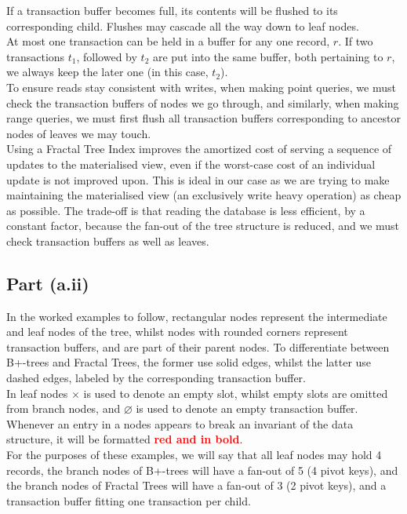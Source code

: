 If a transaction buffer becomes full, its contents will be flushed to its corresponding child. Flushes may cascade all the way down to leaf nodes.\\[1em]

At most one transaction can be held in a buffer for any one record, $r$. If two transactions $t_1$, followed by $t_2$ are put into the same buffer, both pertaining to $r$, we always keep the later one (in this case, $t_2$).\\[1em]

To ensure reads stay consistent with writes, when making point queries, we must check the transaction buffers of nodes we go through, and similarly, when making range queries, we must first flush all transaction buffers corresponding to ancestor nodes of leaves we may touch.\\[1em]

Using a Fractal Tree Index improves the amortized cost of serving a sequence of updates to the materialised view, even if the worst-case cost of an individual update is not improved upon. This is ideal in our case as we are trying to make maintaining the materialised view (an exclusively write heavy operation) as cheap as possible. The trade-off is that reading the database is less efficient, by a constant factor, because the fan-out of the tree structure is reduced, and we must check transaction buffers as well as leaves.

\subsection{Part (a.ii)}\label{sec:q-1-a-ii}

In the worked examples to follow, rectangular nodes represent the intermediate and leaf nodes of the tree, whilst nodes with rounded corners represent transaction buffers, and are part of their parent nodes. To differentiate between B+-trees and Fractal Trees, the former use solid edges, whilst the latter use dashed edges, labeled by the corresponding transaction buffer.\\[1em]

In leaf nodes $\times$ is used to denote an empty slot, whilst empty slots are omitted from branch nodes, and $\varnothing$ is used to denote an empty transaction buffer. Whenever an entry in a nodes appears to break an invariant of the data structure, it will be formatted \textbf{\textcolor{red}{red and in bold}}.\\[1em]

For the purposes of these examples, we will say that all leaf nodes may hold 4 records, the branch nodes of B+-trees will have a fan-out of 5 (4 pivot keys), and the branch nodes of Fractal Trees will have a fan-out of 3 (2 pivot keys), and a transaction buffer fitting one transaction per child.

